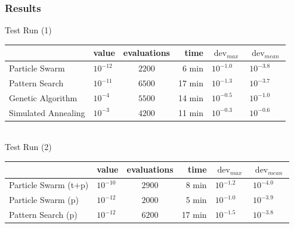 \documentclass{beamer}
\begin{document}
\begin{frame}[c]
	\frametitle{Results}
	Test Run (1)
	\begin{tabular}{l|lcrll}
		                    & value      & evaluations & time   & $\operatorname{dev}_{max}$ & $\operatorname{dev}_{mean}$ \\
		\hline
		Particle Swarm      & $10^{-12}$ & $2200$      & 6 min  & $10^{-1.0}$                & $10^{-3.8}$                 \\
		Pattern Search      & $10^{-11}$ & $6500$      & 17 min & $10^{-1.3}$                & $10^{-3.7}$                 \\
		Genetic Algorithm   & $10^{-4}$  & $5500$      & 14 min & $10^{-0.5}$                & $10^{-1.0}$                 \\
		Simulated Annealing & $10^{-3}$  & $4200$      & 11 min & $10^{-0.3}$                & $10^{-0.6}$                 \\
	\end{tabular} \\
	\vspace{.5cm}
	Test Run (2)
	\begin{tabular}{l|lcrll}
	                       & value      & evaluations & time   & $\operatorname{dev}_{max}$ & $\operatorname{dev}_{mean}$ \\
		\hline
		Particle Swarm (t+p) & $10^{-10}$ & $2900$      & 8 min  & $10^{-1.2}$                & $10^{-4.0}$                 \\
		Particle Swarm (p)   & $10^{-12}$ & $2000$      & 5 min  & $10^{-1.0}$                & $10^{-3.9}$                 \\
		Pattern Search (p)   & $10^{-12}$ & $6200$      & 17 min & $10^{-1.5}$                & $10^{-3.8}$                 \\
	\end{tabular}
\end{frame}
\end{document}
